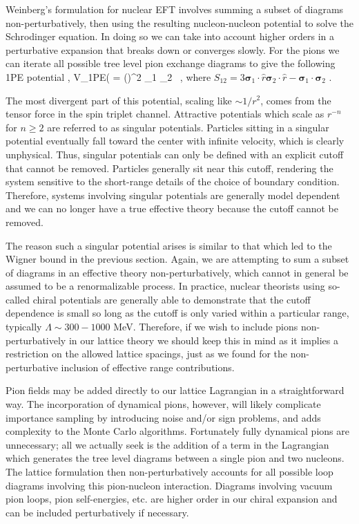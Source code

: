 Weinberg's formulation for nuclear EFT involves summing a subset of diagrams non-perturbatively, then using the resulting nucleon-nucleon potential to solve the Schrodinger equation. In doing so we can take into account higher orders in a perturbative expansion that  breaks down or converges slowly. For the pions we can iterate all possible tree level pion exchange diagrams to give the following 1PE potential \cite{Epelbaum:2010nr},
\beq
V_{\mbox{\tiny 1PE}}( = \left(\right)^2 \mathbf{\tau}_1 \cdot \mathbf{\tau}_2  \ , \cr
\eeq
where $S_{12} = 3\mathbf{\sigma}_1 \cdot \hat{r} \mathbf{\sigma}_2 \cdot \hat{r} - \mathbf{\sigma}_1 \cdot \mathbf{\sigma}_2$ . 

The most divergent part of this potential, scaling like $\sim 1/r^2$, comes from the tensor force in the spin triplet channel. Attractive potentials which scale as $r^{-n}$ for $n \geq 2$ are referred to as singular potentials. Particles sitting in a singular potential eventually fall toward the center with infinite velocity, which is clearly unphysical. Thus, singular potentials can only be defined with an explicit cutoff that cannot be removed. Particles generally sit near this cutoff, rendering the system sensitive to the short-range details of the choice of boundary condition. Therefore, systems involving singular potentials are generally model dependent and we can no longer have a true effective theory because the cutoff cannot be removed. 

The reason such a singular potential arises is similar to that which led to the Wigner bound in the previous section. Again, we are attempting to sum a subset of diagrams in an effective theory non-perturbatively, which cannot in general be assumed to be a renormalizable process. In practice, nuclear theorists using so-called chiral potentials are generally able to demonstrate that the cutoff dependence is small so long as the cutoff is only varied within a particular range, typically $\Lambda \sim 300-1000$ MeV. Therefore, if we wish to include pions non-perturbatively in our lattice theory we should keep this in mind as it implies a restriction on the allowed lattice spacings, just as we found for the non-perturbative inclusion of effective range contributions. 

Pion fields may be added directly to our lattice Lagrangian in a straightforward way. The incorporation of dynamical pions, however, will likely complicate importance sampling by introducing noise and/or sign problems, and adds complexity to the Monte Carlo algorithms. Fortunately fully dynamical pions are unnecessary; all we actually seek is the addition of a term in the Lagrangian which generates the tree level diagrams between a single pion and two nucleons. The lattice formulation then non-perturbatively accounts for all possible loop diagrams involving this pion-nucleon interaction. Diagrams involving vacuum pion loops, pion self-energies, etc. are higher order in our chiral expansion and can be included perturbatively if necessary. 

